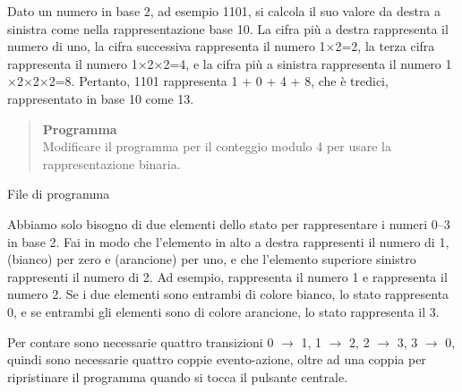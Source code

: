 Dato un numero in base 2, ad esempio 1101, si calcola il suo valore da destra
a sinistra come nella rappresentazione base 10.
La cifra più a destra rappresenta il numero di uno, la cifra successiva
rappresenta il numero 1$\times$2=2, la terza cifra rappresenta
il numero 1$\times$2$\times$2=4, e la cifra più a sinistra
rappresenta il
numero 1$\times$2$\times$2$\times$2=8.
Pertanto, 1101 rappresenta 1 + 0 + 4 + 8, che è tredici,
rappresentato in base 10 come 13.

\newpage

\begin{quote}
\textbf{Programma}\\
Modificare il programma per il conteggio modulo 4 per usare la rappresentazione binaria.
\end{quote}

{\raggedleft \hfill File di programma }

Abbiamo solo bisogno di due elementi dello stato per rappresentare i numeri
0--3 in base 2.
Fai in modo che l'elemento in alto a destra rappresenti il numero di 1,
 (bianco) per zero e  (arancione) per uno,
e che l'elemento superiore sinistro rappresenti il numero di 2.
Ad esempio,  rappresenta il numero 1 e
 rappresenta il numero 2.
Se i due elementi sono entrambi di colore bianco, lo stato rappresenta 0, e se entrambi
gli elementi sono di colore arancione, lo stato rappresenta il 3.

Per contare sono necessarie quattro transizioni 0 $\rightarrow$ 1, 1 $\rightarrow$ 2, 2
$\rightarrow$ 3, 3 $\rightarrow$ 0, quindi sono necessarie quattro coppie evento-azione, oltre ad una coppia per ripristinare il programma
quando si tocca il pulsante centrale.

\medskip


\medskip




